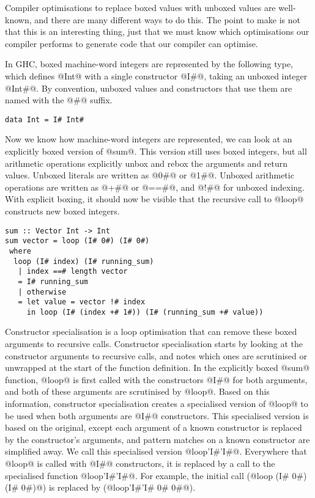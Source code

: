 Compiler optimisations to replace boxed values with unboxed values are well-known, and there are many different ways to do this.
The point to make is not that this is an interesting thing, just that we must know which optimisations our compiler performs to generate code that our compiler can optimise.

In GHC, boxed machine-word integers are represented by the following type, which defines @Int@ with a single constructor @I#@, taking an unboxed integer @Int#@. By convention, unboxed values and constructors that use them are named with the @#@ suffix.

\begin{lstlisting}
data Int = I# Int#
\end{lstlisting}

Now we know how machine-word integers are represented, we can look at an explicitly boxed version of @sum@.
This version still uses boxed integers, but all arithmetic operations explicitly unbox and rebox the arguments and return values.
Unboxed literals are written as @0#@ or @1#@.
Unboxed arithmetic operations are written as @+#@ or @==#@, and @!#@ for unboxed indexing.
With explicit boxing, it should now be visible that the recursive call to @loop@ constructs new boxed integers.

\begin{lstlisting}
sum :: Vector Int -> Int
sum vector = loop (I# 0#) (I# 0#)
 where
  loop (I# index) (I# running_sum)
   | index ==# length vector
   = I# running_sum
   | otherwise
   = let value = vector !# index
     in loop (I# (index +# 1#)) (I# (running_sum +# value))
\end{lstlisting}

Constructor specialisation \cite{peyton2007call} is a loop optimisation that can remove these boxed arguments to recursive calls.
Constructor specialisation starts by looking at the constructor arguments to recursive calls, and notes which ones are scrutinised or unwrapped at the start of the function definition.
In the explicitly boxed @sum@ function, @loop@ is first called with the constructors @I#@ for both arguments, and both of these arguments are scrutinised by @loop@.
Based on this information, constructor specialisation creates a specialised version of @loop@ to be used when both arguments are @I#@ constructors.
This specialised version is based on the original, except each argument of a known constructor is replaced by the constructor's arguments, and pattern matches on a known constructor are simplified away.
We call this specialised version @loop'I#'I#@.
Everywhere that @loop@ is called with @I#@ constructors, it is replaced by a call to the specialised function @loop'I#'I#@.
For example, the initial call (@loop (I# 0#) (I# 0#)@) is replaced by (@loop'I#'I# 0# 0#@).

